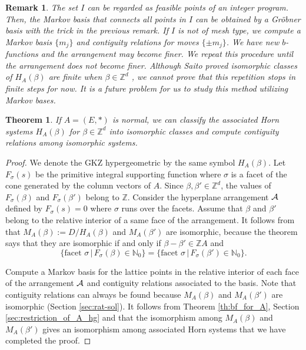 \documentclass{article}
\def\NN{\mathbb{N}}
\def\ZZ{\mathbb{Z}}
\newtheorem{theorem}{Theorem}
\newtheorem{remark}{Remark}
\begin{document}
\begin{remark}\rm
The set $I$ can be regarded as feasible points of an integer program.
Then, the Markov basis that connects all points in $I$ can be obtained 
by a Gr\"obner basis with the trick in the previous remark.
If $I$ is not of mesh type,
we compute a Markov basis $\{ m_j \}$ and
contiguity relations for moves $\{ \pm m_j \}$.
We have new $b$-functions and the arrangement may become finer.  
We repeat this procedure until the arrangement does not become finer.
Although Saito proved isomorphic classes of $H_A(\beta)$
are finite when $\beta \in \ZZ^d$ \cite{saito-isom}, 
we cannot prove that this repetition stops in finite steps for now.
It is a future problem for us to study this method utilizing Markov bases.
\end{remark}



\begin{theorem}
If $A=(E,*)$ is normal, we can classify the associated Horn systems $H_A(\beta)$ 
for $\beta \in \ZZ^d$
into isomorphic classes and compute contiguity relations among isomorphic
systems.
\end{theorem}

\begin{proof}
We denote the GKZ hypergeometric by the same symbol $H_A(\beta)$.
Let $F_\sigma(s)$ be the primitive integral supporting function
where  $\sigma$ is a facet of the cone generated 
by the column vectors of $A$.
Since $\beta, \beta' \in \ZZ^d$,
the values of $F_\sigma(\beta)$ and $F_\sigma(\beta')$ belong to $\ZZ$.
Consider the hyperplane arrangement ${\cal A}$
defined by $F_\sigma(s)=0$ where $\sigma$ runs over the facets.
Assume that $\beta$ and $\beta'$ belong to the relative interior of a same face of the arrangement.
It follows from \cite[Th. 5.2]{saito-isom} that
$M_A(\beta):=D/H_A(\beta)$ and $M_A(\beta')$ are isomorphic,
because the theorem says that they are isomorphic 
if and only if $\beta-\beta' \in \ZZ A$
and
$$
 \{ \mbox{facet $\sigma$} \,|\, F_\sigma(\beta) \in \NN_0 \}
=
 \{ \mbox{facet $\sigma$} \,|\, F_\sigma(\beta') \in \NN_0 \}.
$$

Compute a Markov basis for the lattice points in the relative 
interior of each face of the arrangement ${\cal A}$
and contiguity relations associated to the basis.
Note that contiguity relations can always be found
because $M_A(\beta)$ and $M_A(\beta')$ are isomorphic
(Section \ref{sec:rat-sol}).
It follows from Theorem \ref{th:bf_for_A}, Section \ref{sec:restriction_of_A_hg}
and 
that the isomorphism among $M_A(\beta)$ and $M_A(\beta')$ 
gives an isomorphism among associated Horn systems
that we have completed the proof.
\end{proof}
\end{document}
